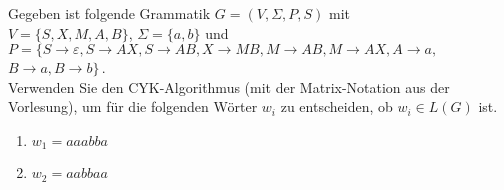 \begin{exercise}
  Gegeben ist folgende Grammatik $G=(V,\Sigma,P,S)$ mit\\[0.2cm]
  $V=\{S,X,M,A,B\}$, $\Sigma=\{a,b\}$ und \\
$P=\{S\longrightarrow \varepsilon,S\longrightarrow AX,S\longrightarrow AB,X\longrightarrow MB,M \longrightarrow AB,M \longrightarrow AX,A \longrightarrow a,$\\
\hspace*{1cm}$B\longrightarrow a,B \longrightarrow b\}$\,.\\[0.2cm]
Verwenden Sie den CYK-Algorithmus (mit der Matrix-Notation aus der
Vorlesung), um für die folgenden Wörter $w_i$ zu entscheiden, ob
$w_i\in L(G)$ ist. 

\begin{enumerate}
 \item $w_1 = aaabba$
 \item $w_2 = aabbaa$
\end{enumerate}    
\end{exercise}

